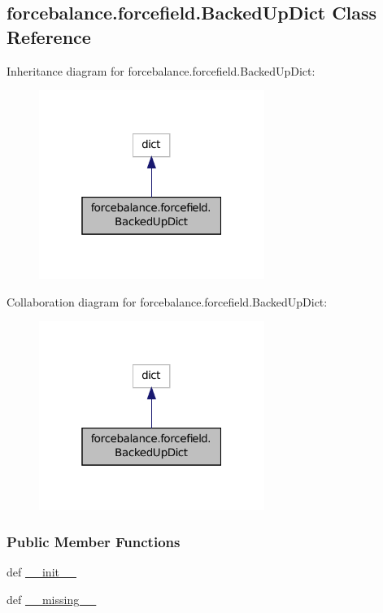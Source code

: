 \hypertarget{classforcebalance_1_1forcefield_1_1BackedUpDict}{\subsection{forcebalance.\-forcefield.\-Backed\-Up\-Dict Class Reference}
\label{classforcebalance_1_1forcefield_1_1BackedUpDict}
}


Inheritance diagram for forcebalance.\-forcefield.\-Backed\-Up\-Dict\-:
\nopagebreak
\begin{figure}[H]
\begin{center}
\leavevmode
\includegraphics[width=208pt]{classforcebalance_1_1forcefield_1_1BackedUpDict__inherit__graph}
\end{center}
\end{figure}


Collaboration diagram for forcebalance.\-forcefield.\-Backed\-Up\-Dict\-:
\nopagebreak
\begin{figure}[H]
\begin{center}
\leavevmode
\includegraphics[width=208pt]{classforcebalance_1_1forcefield_1_1BackedUpDict__coll__graph}
\end{center}
\end{figure}
\subsubsection*{Public Member Functions}
\begin{DoxyCompactItemize}
\item 
def \hyperlink{classforcebalance_1_1forcefield_1_1BackedUpDict_a82e592b405ab38fa3c9d4e0fd27d3545}{\-\_\-\-\_\-init\-\_\-\-\_\-}
\item 
def \hyperlink{classforcebalance_1_1forcefield_1_1BackedUpDict_a1b1c8443d8927bfad95b880dc3dc9594}{\-\_\-\-\_\-missing\-\_\-\-\_\-}
\end{DoxyCompactItemize}
